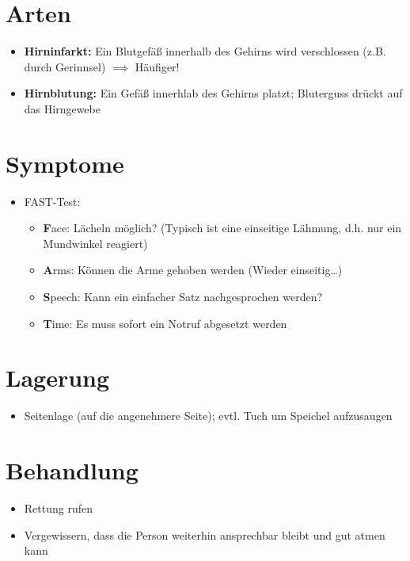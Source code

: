 \section*{Arten}
\begin{itemize}
    \item \textbf{Hirninfarkt:} Ein Blutgefäß innerhalb des Gehirns wird verschlossen (z.B. durch Gerinnsel) $\implies$ Häufiger!
    \item \textbf{Hirnblutung:} Ein Gefäß innerhlab des Gehirns platzt; Bluterguss drückt auf das Hirngewebe
\end{itemize}

\section*{Symptome}
\begin{itemize}
    \item FAST-Test:
    \begin{itemize}
        \item \textbf{F}ace: Lächeln möglich? (Typisch ist eine einseitige Lähmung, d.h. nur ein Mundwinkel reagiert)
        \item \textbf{A}rms: Können die Arme gehoben werden (Wieder einseitig\dots)
        \item \textbf{S}peech: Kann ein einfacher Satz nachgesprochen werden?
        \item \textbf{T}ime: Es muss sofort ein Notruf abgesetzt werden
    \end{itemize}
\end{itemize}

\section*{Lagerung}
\begin{itemize}
    \item Seitenlage (auf die angenehmere Seite); evtl. Tuch um Speichel aufzusaugen
\end{itemize}

\section*{Behandlung}
\begin{itemize}
    \item Rettung rufen
    \item Vergewissern, dass die Person weiterhin ansprechbar bleibt und gut atmen kann
\end{itemize}

